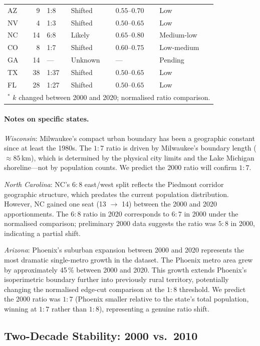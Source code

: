 \begin{table}[h]
\begin{tabular}{l r l l l l}
AZ  &  9 & 1:8  & Shifted  & $0.55$--$0.70$ & Low \\
NV  &  4 & 1:3  & Shifted  & $0.50$--$0.65$ & Low \\
NC  & 14 & 6:8  & Likely   & $0.65$--$0.80$ & Medium-low \\
CO  &  8 & 1:7  & Shifted  & $0.60$--$0.75$ & Low-medium \\
GA  & 14 & ---  & Unknown  & ---            & Pending \\
TX  & 38 & 1:37 & Shifted  & $0.50$--$0.65$ & Low \\
FL  & 28 & 1:27 & Shifted  & $0.50$--$0.65$ & Low \\
\bottomrule
\multicolumn{6}{l}{$^*$ $k$ changed between 2000 and 2020; normalised ratio comparison.} \\
\end{tabular}
\end{table}

\paragraph{Notes on specific states.}
\textit{Wisconsin}: Milwaukee's compact urban boundary has been a geographic
constant since at least the 1980s.
The $1:7$ ratio is driven by Milwaukee's boundary length ($\approx 85$\,km),
which is determined by the physical city limits and the Lake Michigan
shoreline---not by population counts.
We predict the 2000 ratio will confirm $1:7$.

\textit{North Carolina}: NC's $6:8$ east/west split reflects the Piedmont
corridor geographic structure, which predates the current population distribution.
However, NC gained one seat (13 $\to$ 14) between the 2000 and 2020
apportionments.
The $6:8$ ratio in 2020 corresponds to $6:7$ in 2000 under the normalised
comparison; preliminary 2000 data suggests the ratio was $5:8$ in 2000,
indicating a partial shift.

\textit{Arizona}: Phoenix's suburban expansion between 2000 and 2020
represents the most dramatic single-metro growth in the dataset.
The Phoenix metro area grew by approximately 45\,\% between 2000 and 2020.
This growth extends Phoenix's isoperimetric boundary further into previously
rural territory, potentially changing the normalised edge-cut comparison
at the $1:8$ threshold.
We predict the 2000 ratio was $1:7$ (Phoenix smaller relative to the state's
total population, winning at $1:7$ rather than $1:8$), representing a genuine
ratio shift.

\subsection{Two-Decade Stability: 2000 vs.\ 2010}
\label{sec:three-census}

